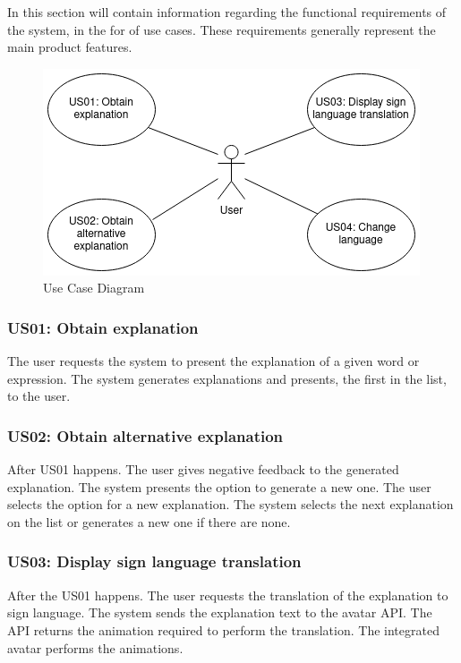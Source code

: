 In this section will contain information regarding the functional requirements of the system, in the for of use cases.
These requirements generally represent the main product features.

\begin{figure}[H]
\centering
\includegraphics[scale=0.65]{ch4/assets/usecasediagram.png}
\caption[Use Case Diagram]{Use Case Diagram}
\label{fig:ucDiagram}
\end{figure}

\subsubsection{US01: Obtain explanation}

The user requests the system to present the explanation of a given word or expression.
The system generates explanations and presents, the first in the list, to the user.

\subsubsection{US02: Obtain alternative explanation}

After US01 happens.
The user gives negative feedback to the generated explanation.
The system presents the option to generate a new one.
The user selects the option for a new explanation.
The system selects the next explanation on the list or generates a new one if there are none.

\subsubsection{US03: Display sign language translation}

After the US01 happens.
The user requests the translation of the explanation to sign language.
The system sends the explanation text to the avatar API.
The API returns the animation required to perform the translation.
The integrated avatar performs the animations.

